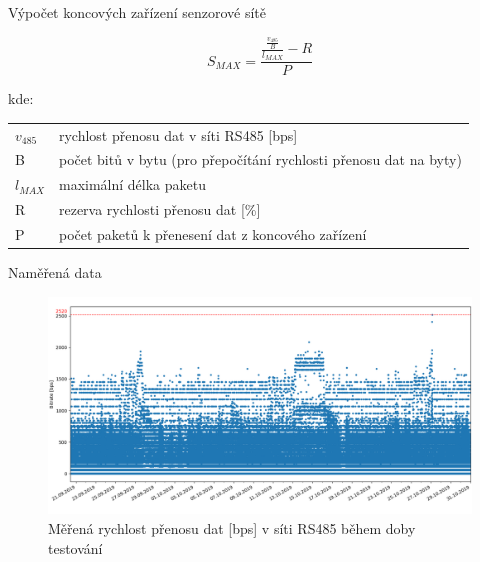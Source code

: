 \documentclass{beamer}
\begin{document}


\begin{frame}{}
\end{frame}



\begin{frame}{Výpočet koncových zařízení senzorové sítě}


	\begin{equation}
		S_{MAX} = \frac{\frac{\frac{v_{485}}{B}}{l_{MAX}} - R}{P}
		\end{equation}
		
	\fontsize{10}{12}\selectfont 

		kde:
		
		\begin{tabular}{l @{  } l}
		$v_{485}$ & rychlost přenosu dat v síti RS485 [bps]\\
		B        & počet bitů v bytu (pro přepočítání rychlosti přenosu dat na byty) \\
		$l_{MAX}$ & maximální délka paketu \\
		R        & rezerva rychlosti přenosu dat [\%]\\
		P        & počet paketů k přenesení dat z koncového zařízení \\
	\end{tabular}

\end{frame}



\begin{frame} {Naměřená data}

	\begin{figure}[!h]
		\centering
		\includegraphics[width=1\textwidth]{03-dr-measured}
		\caption{Měřená rychlost přenosu dat [bps] v síti RS485 během doby testování}
	\end{figure}

\end{frame}
\end{document}

